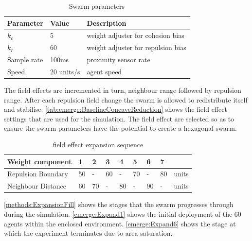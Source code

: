 \begin{table}[H]
\begin{center}
\begin{tabular}{| p{2.5cm} | p{2.0cm} | p{6.0cm} |}
\hline
\bf Parameter & \bf Value  & \bf Description \\ \hline
$k_c$         & 5          & weight adjuster for cohesion bias\\ \hline
$k_r$         & 60         & weight adjuster for repulsion bias\\ \hline
Sample rate   & 100ms      & proximity sensor rate\\ \hline
Speed         & 20 units/s & agent speed\\ \hline
\end{tabular}\caption{Swarm parameters} \label{tab:FillParameters}
\end{center}
\end{table}

The field effects are incremented in turn, neighbour range followed by repulsion range. After each repulsion field change the swarm is allowed to redistribute itself and stabilise. \autoref{tab:emerge:BaselineConcaveReduction} shows the field effect settings that are used for the simulation. The field effect are selected so as to ensure the swarm parameters have the potential to create a hexagonal swarm. 

\begin{table}[H]
\begin{center}
\begin{tabular}{| p{2cm} | p{0.6cm} | p{0.6cm} | p{0.6cm} | p{0.6cm} | p{0.6cm} | p{0.6cm} | p{0.6cm} | p{1cm} |}
\hline
\bf Weight \bf component & \bf 1 & \bf 2 & \bf 3 & \bf 4 & \bf 5 & \bf 6 & \bf 7 & \\ \hline
Repulsion Boundary & 50 & -  & 60 & -  & 70 & -  & 80 & units\\  \hline
Neighbour Distance & 60 & 70 & -  & 80 & -  & 90 & -  & units\\  \hline
\end{tabular}\caption{field effect expansion sequence} \label{tab:FillSequence}
\end{center}
\end{table}

\autoref{methods:ExpansionFill} shows the stages that the swarm progresses through during the simulation. \autoref{emerge:Expand1} shows the initial deployment of the 60 agents within the enclosed environment. \autoref{emerge:Expand6} shows the stage at which the experiment terminates due to area saturation.

